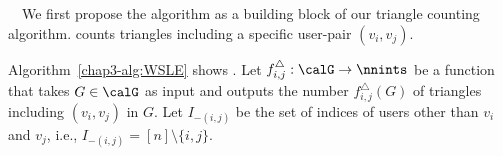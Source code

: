 {}~~We first 
propose 
the \AlgWSLE{} algorithm 
as a building block of our triangle counting algorithm. 
\AlgWSLE{} counts 
triangles including a specific user-pair $(v_i,v_j)$. 

Algorithm~\ref{chap3-alg:WSLE} shows \AlgWSLE{}. 
Let $f_{i,j}^\triangle: \calG \rightarrow \nnints$ be a function that takes $G \in \calG$ as input and outputs the number $f_{i,j}^\triangle(G)$ of triangles including $(v_i,v_j)$ in $G$. 
Let $I_{-(i,j)}$ be the set of indices of users other than $v_i$ and $v_j$, i.e., $I_{-(i,j)} = [n]\setminus\{i,j\}$. 

